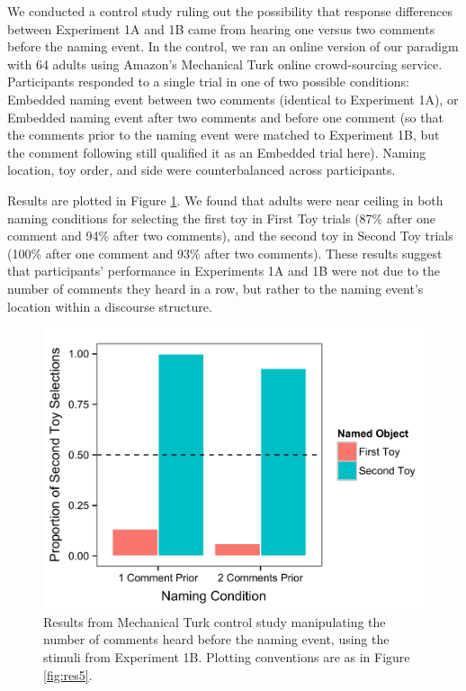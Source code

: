\documentclass[man]{apa2}
\begin{document}
We conducted a control study ruling out the possibility that response differences between Experiment 1A and 1B came from hearing one versus two comments before the naming event.  In the control, we ran an online version of our paradigm with 64 adults using Amazon's Mechanical Turk online crowd-sourcing service.  Participants responded to a single trial in one of two possible conditions: Embedded naming event between two comments (identical to Experiment 1A), or Embedded naming event after two comments and before one comment (so that the comments prior to the naming event were matched to Experiment 1B, but the comment following still qualified it as an Embedded trial here).  Naming location, toy order, and side were counterbalanced across participants. 

Results are plotted in Figure \ref{fig:control}. We found that adults were near ceiling in both naming conditions for selecting the first toy in First Toy trials (87\% after one comment and 94\% after two comments), and the second toy in Second Toy trials (100\% after one comment and 93\% after two comments).  These results suggest that participants' performance in Experiments 1A and 1B were not due to the number of comments they heard in a row, but rather to the naming event's location within a discourse structure.



\begin{figure}
  \begin{center} 
    \includegraphics[width=5in]{figures/continuity_turk_2and3comments_mod.pdf}

    \caption{\label{fig:control} Results from Mechanical Turk control study manipulating the number of comments heard before the naming event, using the stimuli from Experiment 1B. Plotting conventions are as in Figure \ref{fig:res5}.} 
  \end{center} 
\end{figure}
\end{document}

